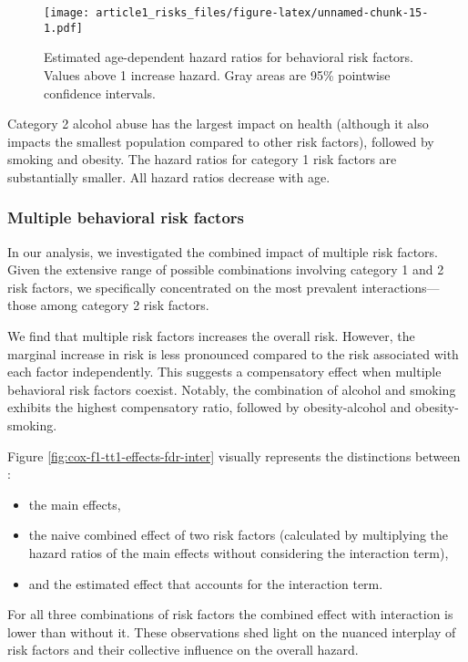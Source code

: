 \documentclass[risks,article,submit,moreauthors,pdftex]{Definitions/mdpi}
\providecommand{\tightlist}{%
  \setlength{\itemsep}{0pt}\setlength{\parskip}{0pt}}
\begin{document}
\begin{figure}
\centering
\texttt{[image: article1\_risks\_files/figure-latex/unnamed-chunk-15-1.pdf]}
\caption{\label{fig:cox_f1_tt1_effects_fdr} Estimated age-dependent
hazard ratios for behavioral risk factors. Values above 1 increase
hazard. Gray areas are 95\% pointwise confidence intervals.}
\end{figure}

Category 2 alcohol abuse has the largest impact on health (although it
also impacts the smallest population compared to other risk factors),
followed by smoking and obesity. The hazard ratios for category 1 risk
factors are substantially smaller. All hazard ratios decrease with age.

\hypertarget{multiple-behavioral-risk-factors}{%
\subsubsection{Multiple behavioral risk
factors}\label{multiple-behavioral-risk-factors}}

In our analysis, we investigated the combined impact of multiple risk
factors. Given the extensive range of possible combinations involving
category 1 and 2 risk factors, we specifically concentrated on the most
prevalent interactions---those among category 2 risk factors.

We find that multiple risk factors increases the overall risk. However,
the marginal increase in risk is less pronounced compared to the risk
associated with each factor independently. This suggests a compensatory
effect when multiple behavioral risk factors coexist. Notably, the
combination of alcohol and smoking exhibits the highest compensatory
ratio, followed by obesity-alcohol and obesity-smoking.

Figure \ref{fig:cox-f1-tt1-effects-fdr-inter} visually represents the
distinctions between :

\begin{itemize}
\tightlist
\item
  the main effects,
\item
  the naive combined effect of two risk factors (calculated by
  multiplying the hazard ratios of the main effects without considering
  the interaction term),
\item
  and the estimated effect that accounts for the interaction term.
\end{itemize}

For all three combinations of risk factors the combined effect with
interaction is lower than without it. These observations shed light on
the nuanced interplay of risk factors and their collective influence on
the overall hazard.
\end{document}
